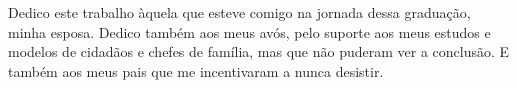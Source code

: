 
\begin{dedicatoria}

Dedico este trabalho àquela que esteve comigo na jornada dessa graduação, minha esposa. Dedico também aos meus avós, pelo suporte aos meus estudos e modelos de cidadãos e chefes de família, mas que não puderam ver a conclusão. E também aos meus pais que me incentivaram a nunca desistir.

\end{dedicatoria}
